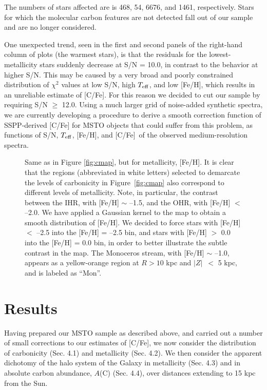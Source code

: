 \documentclass[iop]{emulateapj}
\newcommand*{\teff}{$T_{\rm eff}$}
\newcommand*{\feh}{[Fe/H]}
\newcommand*{\cfe}{[C/Fe]}
\newcommand*{\z}{$|Z|$}
\begin{document}
\noindent The numbers of stars affected are is 468, 54, 6676, and 1461, respectively.
Stars for which the molecular carbon features are not detected fall out
of our sample and are no longer considered.

One unexpected trend, seen in the first and second panels of the
right-hand column of plots (the warmest stars), is that the residuals for the
lowest-metallicity stars suddenly decrease at S/N = 10.0, in contrast
to the behavior at higher S/N. This may be caused by a very broad and
poorly constrained distribution of $\chi^{2}$ values at low S/N, high
\teff, and low \feh, which results in an unreliable estimate of \cfe. For
this reason we decided to cut our sample by requiring S/N $\ge$ 12.0.
Using a much larger grid of noise-added synthetic spectra, we are
currently developing a procedure to derive a smooth correction function
of SSPP-derived [C/Fe] for MSTO objects that could suffer from this
problem, as functions of S/N, \teff, \feh, and \cfe\ of the observed
medium-resolution spectra.

\begin{figure}
\centering
{}
\caption{Same as in Figure \ref{fig:cmap}, but for metallicity, [Fe/H].
It is clear that the regions (abbreviated in white letters) selected to
demarcate the levels of carbonicity in Figure~\ref{fig:cmap} also
correspond to different levels of metallicity. Note, in particular, the
contrast between the IHR, with [Fe/H] $\sim$ --1.5, and the OHR, with
[Fe/H] $<$ --2.0. We have applied a Gaussian kernel to the map to obtain
a smooth distribution of [Fe/H]. We decided to force stars with [Fe/H]
$<$ --2.5 into the [Fe/H] = --2.5 bin, and stars with [Fe/H] $>$ 0.0
into the [Fe/H] = 0.0 bin, in order to better illustrate the subtle
contrast in the map. The Monoceros stream, with [Fe/H] $\sim$ --1.0,
appears as a yellow-orange region at $R > 10$ kpc and \z\ $<$ 5 kpc, and
is labeled as ``Mon''.}
\label{fig:fmap}
\end{figure}


\section{Results}

Having prepared our MSTO sample as described above, and carried out a
number of small corrections to our estimates of [C/Fe], we now consider
the distribution of carbonicity (Sec. 4.1) and  metallicity (Sec. 4.2).
We then consider the apparent dichotomy of the halo system of the Galaxy in
metallicity (Sec. 4.3) and in absolute carbon abundance, $A$(C) (Sec.
4.4), over distances extending to 15 kpc from the Sun.
\end{document}
